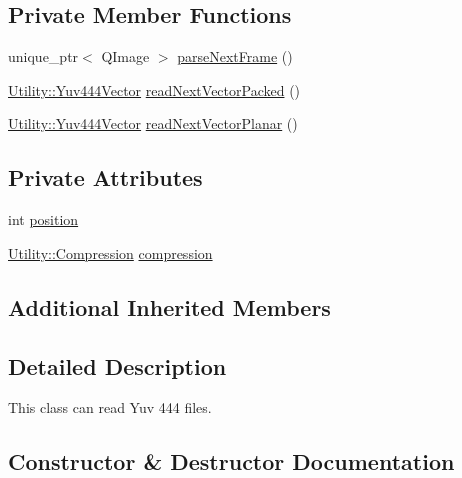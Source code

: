 \subsection*{Private Member Functions}
\begin{DoxyCompactItemize}
\item 
unique\+\_\+ptr$<$ Q\+Image $>$ \hyperlink{classUtility_1_1Yuv444FileReader_a22ed1cd234a6f19e4108129f99faa4ad}{parse\+Next\+Frame} ()
\item 
\hyperlink{classUtility_1_1Yuv444Vector}{Utility\+::\+Yuv444\+Vector} \hyperlink{classUtility_1_1Yuv444FileReader_aa596ec1e33c8556aad979ce9319ad148}{read\+Next\+Vector\+Packed} ()
\item 
\hyperlink{classUtility_1_1Yuv444Vector}{Utility\+::\+Yuv444\+Vector} \hyperlink{classUtility_1_1Yuv444FileReader_ad88e2b9a82da3c3a2ab91ee1cc60902e}{read\+Next\+Vector\+Planar} ()
\end{DoxyCompactItemize}
\subsection*{Private Attributes}
\begin{DoxyCompactItemize}
\item 
int \hyperlink{classUtility_1_1Yuv444FileReader_a401e942526aac47cef94f478182486e7}{position}
\item 
\hyperlink{namespaceUtility_a56a83bf6847f4801f4205eb4be237ccf}{Utility\+::\+Compression} \hyperlink{classUtility_1_1Yuv444FileReader_aa484ffcb0c9f4d4dea91c6fae73f1fda}{compression}
\end{DoxyCompactItemize}
\subsection*{Additional Inherited Members}


\subsection{Detailed Description}
This class can read Yuv 444 files. 

\subsection{Constructor \& Destructor Documentation}
\hypertarget{classUtility_1_1Yuv444FileReader_ac46c1b5839e838d4a3ac247434d32876}{}

